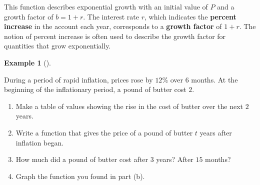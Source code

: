 \documentclass[10pt,]{book}
\newcommand{\terminology}[1]{\textbf{#1}}
\theoremstyle{plain}
\theoremstyle{definition}
\theoremstyle{definition}
\theoremstyle{definition}
\newtheorem{example}[theorem]{Example}
\theoremstyle{definition}
\theoremstyle{definition}
\numberwithin{equation}{section}
\begin{document}
    This function describes exponential growth with an initial value of \(P\) and a growth factor of \(b = 1 + r\). The interest rate \(r\), which indicates the \terminology{percent increase} in the account each year, corresponds to a \terminology{growth factor} of \(1 + r\). The notion of percent increase is often used to describe the growth factor for quantities that grow exponentially.
%
\begin{example}[]\label{example-inflation}

    During a period of rapid inflation, prices rose by \(12\)\% over \(6\) months. At the beginning of the inflationary period, a pound of butter cost \textdollar{}\(2\).
    \leavevmode%
\begin{enumerate}[label=*\alph**]
\item\hypertarget{li-615}{}Make a table of values showing the rise in the cost of butter over the next \(2\) years.\item\hypertarget{li-616}{}Write a function that gives the price of a pound of butter \(t\) years after inflation began.\item\hypertarget{li-617}{}How much did a pound of butter cost after \(3\) years? After \(15\) months?\item\hypertarget{li-618}{}Graph the function you found in part (b).\end{enumerate}


\end{example}
\end{document}
